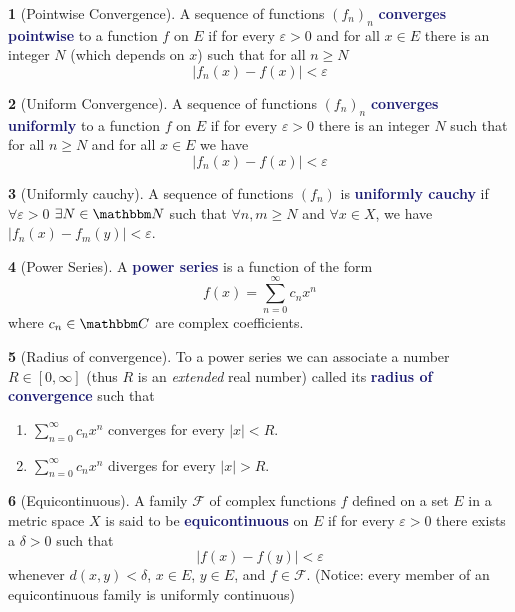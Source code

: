 \documentclass[12pt]{article}
\numberwithin{equation}{section}
\newcommand{\navy}[1]{\textcolor{MidnightBlue}{\bf #1}}
\theoremstyle{plain}
\theoremstyle{definition}
\newtheorem{definition}{\color{MidnightBlue}{\textbf{Definition}}}[section]
\newcommand{\1}{\mathbbm 1}
\def\d{\delta}
\newcommand{\e}{\varepsilon}
\newcommand{\CC}{\mathbbm C}
\newcommand{\NN}{\mathbbm N}
\newcommand{\fF}{\mathscr F}
\begin{document}
\begin{definition}[Pointwise Convergence]
A sequence of functions $(f_n)_n$ \navy{converges pointwise} to a function $f$ on $E$ if for every $\e > 0$ and for all $x \in E$ there is an integer $N$ (which depends on $x$) such that for all $n \geq N$
\begin{equation*}
|f_n(x) - f(x)| < \e
\end{equation*}
\end{definition}

\begin{definition}[Uniform Convergence]
A sequence of functions $(f_n)_n$ \navy{converges uniformly} to a function $f$ on $E$ if for every $\e > 0$ there is an integer $N$ such that for all $n \geq N$ and for all $x \in E$ we have
\begin{equation*}
|f_n(x) - f(x)| < \e
\end{equation*}
\end{definition}

\begin{definition}[Uniformly cauchy]
A sequence of functions $(f_n)$ is \navy{uniformly cauchy} if $\forall \e > 0$ $\exists N \in \NN$ such that $\forall n,m \geq N$ and $\forall x \in X$, we have $|f_n(x) - f_m(y)| < \e$.
\end{definition}

\begin{definition}[Power Series]
A \navy{power series} is a function of the form
\begin{equation}
f(x) = \sum_{n=0}^\infty c_n x^n
\end{equation}
where $c_n \in \CC$ are complex coefficients.
\end{definition}

\begin{definition}[Radius of convergence]
To a power series we can associate a number $R \in [0, \infty]$ (thus $R$ is an \emph{extended} real number) called its \navy{radius of convergence} such that
\begin{enumerate}
\item $\sum_{n=0}^\infty c_n x^n$ converges for every $|x| < R$.
\item $\sum_{n=0}^\infty c_n x^n$ diverges for every $|x| > R$.
\end{enumerate}
\end{definition}

\begin{definition}[Equicontinuous]
A family $\fF$ of complex functions $f$ defined on a set $E$ in a metric space $X$ is said to be \navy{equicontinuous} on $E$ if for every $\e > 0$ there exists a $\d > 0$ such that
\begin{equation*}
|f(x) - f(y)| < \e
\end{equation*}
whenever $d(x,y) < \d$, $x \in E$, $y \in E$, and $f \in \fF$. (Notice: every member of an equicontinuous family is uniformly continuous)
\end{definition}
\end{document}
